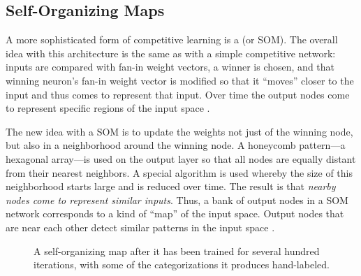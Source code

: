 \subsection{Self-Organizing Maps}

A more sophisticated form of competitive learning is a  (or SOM). The overall idea with this architecture is the same as with a simple competitive network: inputs are compared with fan-in weight vectors, a winner is chosen, and that winning neuron's fan-in weight vector is modified so that it ``moves'' closer to the input and thus comes to represent that input. Over time the output nodes come to represent specific regions of the input space \cite{kohonen1990self}.

The new idea with a SOM is to update the weights not just of the winning node, but also in a neighborhood around the winning node. A honeycomb pattern---a hexagonal array---is used on the output layer so that all nodes are equally distant from their nearest neighbors. A special algorithm is used whereby the size of this neighborhood starts large and is reduced over time. The result is that \emph{nearby nodes come to represent similar inputs}. Thus, a bank of output nodes in a SOM network corresponds to a kind of ``map'' of the input space. Output nodes that are near each other detect similar patterns in the input space \cite{kohonen1990self}. 



\begin{figure}[h]
\centering
{}
\caption[Simbrain screenshot.]{A self-organizing map after it has been trained for several hundred iterations, with some of the categorizations it produces hand-labeled.}
\label{som_labelled}
\end{figure}

